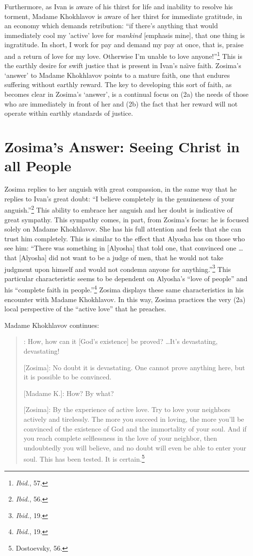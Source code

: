  Furthermore, as Ivan is aware of his thirst for life and inability to resolve his torment, Madame Khokhlavov is aware of her thirst for immediate gratitude, in an economy which demands retribution: ``if there's anything that would immediately cool my 'active' love for \emph{mankind} [emphasis mine], that one thing is ingratitude. In short, I work for pay and demand my pay at once, that is, praise and a return of love for my love. Otherwise I'm unable to love anyone!\thinspace''\footnote{\emph{Ibid.}, 57.} This is the earthly desire for swift justice that is present in Ivan's na\"{\i}ve faith. Zosima's `answer' to Madame Khokhlavov points to a mature faith, one that endures suffering without earthly reward. The key to developing this sort of faith, as becomes clear in Zosima's `answer', is a continual focus on (2a) the needs of those who are immediately in front of her and (2b) the fact that her reward will not operate within earthly standards of justice.

\section{Zosima's Answer: Seeing Christ in all People}
Zosima replies to her anguish with great compassion, in the same way that he replies to Ivan's great doubt: ``I believe completely in the genuineness of your anguish.''\footnote{\emph{Ibid.}, 56.} This ability to embrace her anguish and her doubt is indicative of great sympathy. This sympathy comes, in part, from Zosima's focus: he is focused solely on Madame Khokhlavov. She has his full attention and feels that she can trust him completely. This is similar to the effect that Alyosha has on those who see him: ``There was something in [Alyosha] that told one, that convinced one \ldots that [Alyosha] did not want to be a judge of men, that he would not take judgment upon himself and would not condemn anyone for anything.''\footnote{\emph{Ibid.}, 19.} This particular characteristic seems to be dependent on Alyosha's ``love of people'' and his ``complete faith in people.''\footnote{\emph{Ibid.}, 19.} Zosima displays these same characteristics in his encounter with Madame Khokhlavov. In this way, Zosima practices the very (2a) local perspective of the ``active love'' that he preaches.

Madame Khokhlavov continues:
\begin{quote}
\singlespacing
[Madame K.]: How, how can it [God's existence] be proved? \ldots It's devastating, devastating!

[Zosima]: No doubt it is devastating. One cannot prove anything here, but it is possible to be convinced.

[Madame K.]: How? By what?

[Zosima]: By the experience of active love. Try to love your neighbors actively and tirelessly. The more you succeed in loving, the more you'll be convinced of the existence of God and the immortality of your soul. And if you reach complete selflessness in the love of your neighbor, then undoubtedly you will believe, and no doubt will even be able to enter your soul. This has been tested. It is certain.\footnote{Dostoevsky, 56.}
\end{quote}

